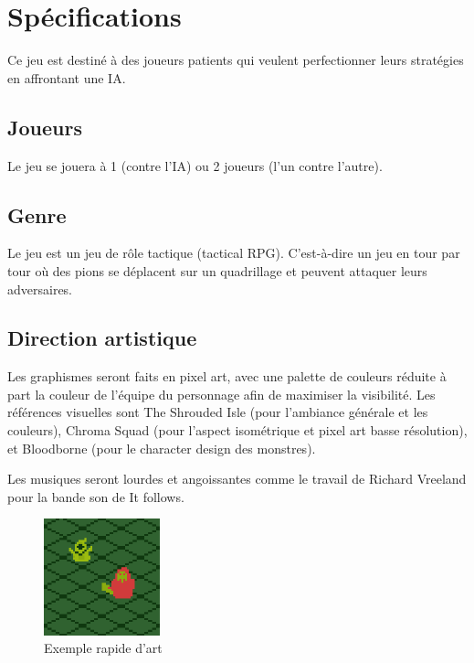\documentclass[a4paper]{scrreprt}
\begin{document}

\chapter{Spécifications}
Ce jeu est destiné à des joueurs patients qui veulent perfectionner leurs stratégies en affrontant une IA.

\section{Joueurs}

Le jeu se jouera à 1 (contre l'IA) ou 2 joueurs (l'un contre l'autre).

\section{Genre}
Le jeu est un jeu de rôle tactique (tactical RPG). C'est-à-dire un jeu en tour par tour où des pions se déplacent sur un quadrillage et peuvent attaquer leurs adversaires.

\section{Direction artistique}
Les graphismes seront faits en pixel art, avec une palette de couleurs réduite à part la couleur de l'équipe du personnage afin de maximiser la visibilité.
Les références visuelles sont The Shrouded Isle (pour l'ambiance générale et les couleurs), Chroma Squad (pour l'aspect isométrique et pixel art basse résolution), et Bloodborne (pour le character design des monstres).

Les musiques seront lourdes et angoissantes comme le travail de Richard Vreeland pour la bande son de It follows.

\begin{figure}
\centering
\includegraphics[width=0.3\textwidth]{images/example.png}
\caption{\label{fig:art} Exemple rapide d'art}
\end{figure}
\end{document}
